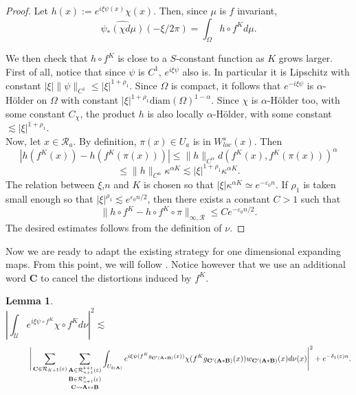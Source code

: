 \documentclass[a4paper]{article}
\newtheorem{lemma}[theorem]{Lemma}
\theoremstyle{definition}
\begin{document}
\begin{proof}

Let $h(x) := e^{ i \xi \psi(x)} \chi(x) $. Then, since $\mu$ is $f$ invariant, $$ \widehat{\psi_*(\chi d\mu)}(-\xi/2\pi) = \int_\Omega h \circ f^K d\mu .$$

We then check that $h \circ f^K$ is close to a $S$-constant function as $K$ grows larger.
First of all, notice that since $\psi$ is $C^1$, $e^{i \xi \psi}$ also is. In particular it is Lipschitz with constant $|\xi| \|\psi\|_{C^1} \leq |\xi|^{1+\rho_1}$. Since $\Omega$ is compact, it follows that $e^{- i \xi \psi}$ is $\alpha$-Hölder on $\Omega$ with constant $|\xi|^{1+\rho_1} \text{diam}(\Omega)^{1-\alpha}$. Since $\chi$ is $\alpha$-Hölder too, with some constant $C_{\chi}$, the product $h$ is also locally $\alpha$-Hölder, with some constant $\lesssim |\xi|^{1+\rho_1} $. \\

Now, let $x \in \mathcal{R}_a$. By definition, $\pi(x) \in U_a$ is in $W^s_{loc}(x)$. Then $$ |h(f^K(x)) - h(f^K(\pi(x))) | \leq \|h\|_{C^\alpha} d( f^K(x),f^K(\pi(x)) )^\alpha $$ $$\leq \|h\|_{C^\alpha} \kappa^{\alpha K} \lesssim |\xi|^{1+\rho_1} \kappa^{\alpha K} .$$
The relation between $\xi$,$n$ and $K$ is chosen so that $|\xi| \kappa^{\alpha K} \simeq e^{-\varepsilon_0 n}$. If $\rho_1$ is taken small enough so that $|\xi|^{\rho_1}\lesssim e^{ \varepsilon_0 n/2}$, then there exists a constant $C>1$ such that 
$$ \| h \circ f^K - h \circ f^K \circ \pi \|_{\infty,\mathcal{R}} \leq C e^{- \varepsilon_0 n/2} .$$
The desired estimates follows from the definition of $\nu$. \end{proof}

Now we are ready to adapt the existing strategy for one dimensional expanding maps. From this point, we will follow \cite{SS20}. Notice however that we use an additional word $\mathbf{C}$ to cancel the distortions induced by $f^K$.

\begin{lemma}
$$ \left| \int_{\mathcal{U}} e^{i \xi \psi \circ f^K} \chi \circ f^K d \nu \right|^2 \lesssim \quad \quad \quad \quad \quad \quad \quad \quad \quad \quad \quad \quad \quad \quad \quad \quad \quad \quad \quad \quad \quad \quad \quad \quad \quad \quad \quad \quad \quad \quad $$ $$\quad \quad \quad  \Bigg{|} \sum_{\mathbf{C} \in \mathcal{R}_{K+1}(\varepsilon)} \underset{\mathbf{C} \rightsquigarrow \mathbf{A} \leftrightarrow \mathbf{B}}{ \underset{ \mathbf{B} \in \mathcal{R}_{n+1}^k(\varepsilon)}{ \underset{\mathbf{A} \in \mathcal{R}_{n+1}^{k+1}(\varepsilon) }{ \sum}} } \int_{U_{b(\mathbf{A})}} e^{i \xi \psi( f^K g_{\mathbf{C}'(\mathbf{A} * \mathbf{B})}(x))}  \chi(f^K g_{\mathbf{C}'(\mathbf{A} * \mathbf{B})}(x))  w_{\mathbf{C}'(\mathbf{A} * \mathbf{B})}(x)d\nu(x) \Bigg{|}^2 + e^{- \delta_1(\varepsilon) n }. $$

\end{lemma}
\end{document}
